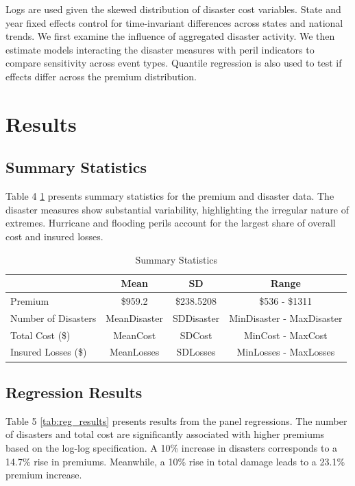 \documentclass[12pt]{article}
\begin{document}
Logs are used given the skewed distribution of disaster cost variables. State and year fixed effects control for time-invariant 
differences across states and national trends. We first examine the influence of aggregated disaster activity. We then estimate 
models interacting the disaster measures with peril indicators to compare sensitivity across event types. Quantile regression is 
also used to test if effects differ across the premium distribution.



\section{Results}
\label{sec:resu}
\subsection{Summary Statistics}
Table 4 \ref{tab:summary} presents summary statistics for the premium and disaster data. The disaster measures show substantial variability, 
highlighting the irregular nature of extremes. Hurricane and flooding perils account for the largest share of overall cost and 
insured losses.

\begin{table}[h]
    \label{tab:summary}
    \centering
    \begin{tabular}{|l|c|c|c|}
        \hline
        & Mean & SD & Range \\
        \hline
        Premium & \$\num{959.2} & \$\num{238.5208} & \$\num{536} - \$\num{1311} \\
        Number of Disasters & MeanDisaster & SDDisaster & MinDisaster - MaxDisaster \\
        Total Cost (\$) & MeanCost & SDCost & MinCost - MaxCost \\
        Insured Losses (\$) & MeanLosses & SDLosses & MinLosses - MaxLosses \\
        \hline
    \end{tabular}
    \caption{Summary Statistics}
    \cite{statista, ncai, fema}
\end{table}

\subsection{Regression Results}
Table 5 \ref{tab:reg_results} presents results from the panel regressions. The number of disasters and total cost are significantly associated with 
higher premiums based on the log-log specification. A 10\% increase in disasters corresponds to a 14.7\% rise in premiums. Meanwhile, 
a 10\% rise in total damage leads to a 23.1\% premium increase.
\end{document}
